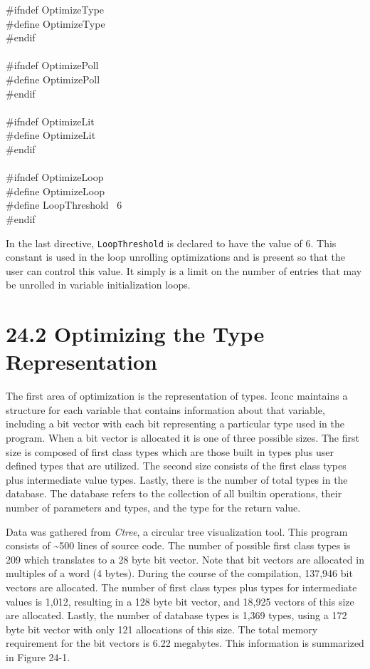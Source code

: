 \goodbreak
\begin{iconcode}
\#ifndef OptimizeType\\
\#define OptimizeType\\
\#endif\\
\\
\#ifndef OptimizePoll\\
\#define OptimizePoll\\
\#endif\\
\\
\#ifndef OptimizeLit\\
\#define OptimizeLit\\
\#endif\\
\\
\#ifndef OptimizeLoop\\
\#define OptimizeLoop\\
\#define LoopThreshold \ 6\\
\#endif\\
\end{iconcode}


In the last directive, \texttt{LoopThreshold} is declared to have the
value of 6. This constant is used in the loop unrolling optimizations
and is present so that the user can control this value. It simply is a
limit on the number of entries that may be unrolled in variable
initialization loops.


\section[24.2 Optimizing the Type Representation]{24.2 Optimizing the Type Representation}

The first area of optimization is the representation of types. Iconc
maintains a structure for each variable that contains information
about that variable, including a bit vector with each bit representing
a particular type used in the program. When a bit vector is allocated
it is one of three possible sizes. The first size is composed of first
class types which are those built in types plus user defined types
that are utilized. The second size consists of the first class types
plus intermediate value types. Lastly, there is the number of total
types in the database. The database refers to the collection of all
builtin operations, their number of parameters and types, and the type
for the return value.

Data was gathered from \textit{Ctree}, a circular tree visualization
tool. This program consists of \~{}500 lines of source code. The
number of possible first class types is 209 which translates to a 28
byte bit vector. Note that bit vectors are allocated in multiples of a
word (4 bytes). During the course of the compilation, 137,946 bit
vectors are allocated. The number of first class types plus types for
intermediate values is 1,012, resulting in a 128 byte bit vector, and
18,925 vectors of this size are allocated. Lastly, the number of
database types is 1,369 types, using a 172 byte bit vector with only
121 allocations of this size. The total memory requirement for the bit
vectors is 6.22 megabytes. This information is summarized in Figure
24-1.

